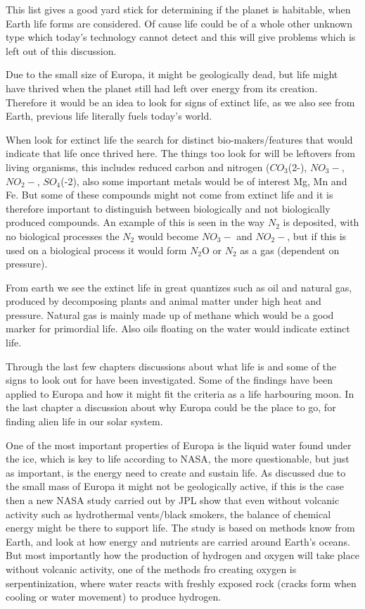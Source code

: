 This list gives a good yard stick for determining if the planet is habitable, when Earth life forms are considered. Of cause life could be of a whole other unknown type which today's technology cannot detect and this will give problems which is left out of this discussion.


Due to the small size of Europa, it might be geologically dead, but life might have thrived when the planet still had left over energy from its creation. Therefore it would be an idea to look for signs of extinct life, as we also see from Earth, previous life literally fuels today's world.

When look for extinct life the search for distinct bio-makers/features that would indicate that life once thrived here. The things too look for will be leftovers from living organisms, this includes reduced carbon and nitrogen ($CO_3$(2-), $NO_3-$, $NO_2-$, $SO_4$(-2), also some important metals would be of interest Mg, Mn and Fe. But some of these compounds might not come from extinct life and it is therefore important to distinguish between biologically and not biologically produced compounds. An example of this is seen in the way $N_2$ is deposited, with no biological processes the $N_2$ would become $NO_3-$ and $NO_2-$, but if this is used on a biological process it would form $N_2$O or $N_2$ as a gas  (dependent on pressure)\cite{BiomarkersMars}.

From earth we see the extinct life in great quantizes such as oil and natural gas, produced by decomposing plants and animal matter under high heat and pressure. Natural gas is mainly made up of methane which would be a good marker for primordial life. Also oils floating on the water would indicate extinct life.

Through the last few chapters discussions about what life is and some of the signs to look out for have been investigated. Some of the findings have been applied to Europa and how it might fit the criteria as a life harbouring moon. In the last chapter a discussion about why Europa could be the place to go, for finding alien life in our solar system.


One of the most important properties of Europa is the liquid water found under the ice, which is key to life according to NASA, the more questionable, but just as important, is the energy need to create and sustain life. As discussed due to the small mass of Europa it might not be geologically active, if this is the case then a new NASA study carried out by JPL\cite{EuropasOceanLife} show that even without volcanic activity such as hydrothermal vents/black smokers, the balance of chemical energy might be there to support life. The study is based on methods know from Earth, and look at how energy and nutrients are carried around Earth's oceans. But most importantly how the production of hydrogen and oxygen will take place without volcanic activity, one of the methods fro creating oxygen is serpentinization, where water reacts with freshly exposed rock (cracks form when cooling or water movement) to produce hydrogen.

